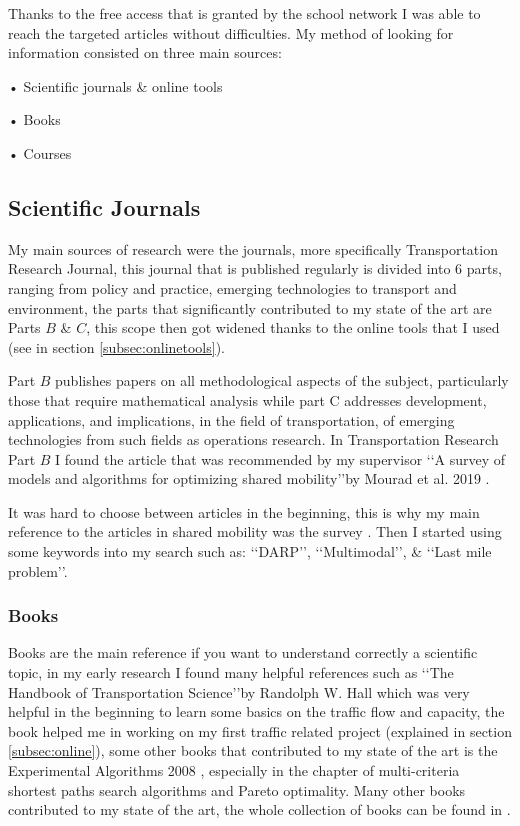 \documentclass{article}
\begin{document}
Thanks to the free access that is granted by the school network I was able to reach the targeted articles without difficulties. My method of looking for information consisted on three main sources:
\begin{list}{}
\item • Scientific journals \& online tools
\item • Books
\item • Courses
\end{list}

\subsection{Scientific Journals}
My main sources of research were the journals, more specifically Transportation Research Journal, this journal that is published regularly is divided into $6$ parts, ranging from policy and practice, emerging technologies to transport and environment, 
the parts that significantly contributed to my state of the art are Parts $B$ \& $C$, this scope then got widened thanks to the online tools that I used (see in section \ref{subsec:onlinetools}). 

Part $B$ publishes papers on all methodological aspects of the subject, particularly those that require mathematical analysis while part C addresses development, applications, and implications, in the field of transportation, of emerging technologies
 from such fields as operations research. In Transportation Research Part $B$ I found the article that was recommended by my supervisor \lq\lq{A survey of models and algorithms for optimizing shared mobility}\rq\rq by Mourad et al. 2019 \citep{MOURAD2019}.

It was hard to choose between articles in the beginning, this is why my main reference to the articles in shared mobility was the survey \citep{MOURAD2019}. Then I started using some keywords into my search such as: \lq\lq{DARP}\rq\rq, \lq\lq{Multimodal}\rq\rq, \& \lq\lq{Last mile problem}\rq\rq.

\subsubsection{Books}

Books are the main reference if you want to understand correctly a scientific topic, in my early research I found many helpful references such as \lq\lq{The Handbook of Transportation Science}\rq\rq by Randolph W. Hall \cite{Randolphts} which was very helpful in the beginning to learn some basics on the traffic flow and capacity, the book helped me in working on my first traffic related project (explained in section \ref{subsec:online}), some other books that contributed to my state of the art is the Experimental Algorithms 2008 \cite{bookexpalg}, especially in the chapter of multi-criteria shortest paths search algorithms and Pareto optimality. Many other books contributed to my state of the art, the whole collection of books can be found in  \cite{my_bibliography}.
\end{document}
